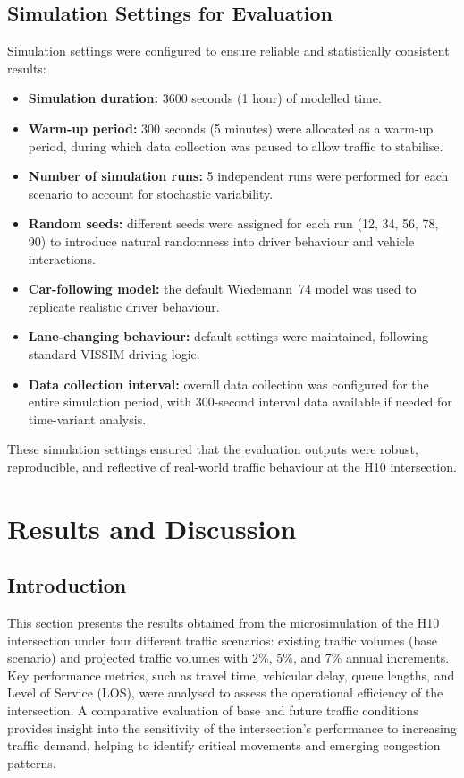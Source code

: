 \documentclass[11pt]{article}
\begin{document}
\subsection{Simulation Settings for Evaluation}
Simulation settings were configured to ensure reliable and statistically consistent results:
\begin{itemize}
  \item \textbf{Simulation duration:} 3600 seconds (1 hour) of modelled time.
  \item \textbf{Warm-up period:} 300 seconds (5 minutes) were allocated as a warm-up period, during
  which data collection was paused to allow traffic to stabilise.
  \item \textbf{Number of simulation runs:} 5 independent runs were performed for each scenario to
  account for stochastic variability.
  \item \textbf{Random seeds:} different seeds were assigned for each run (12, 34, 56, 78, 90) to
  introduce natural randomness into driver behaviour and vehicle interactions.
  \item \textbf{Car-following model:} the default Wiedemann~74 model was used to replicate realistic
  driver behaviour.
  \item \textbf{Lane-changing behaviour:} default settings were maintained, following standard VISSIM
  driving logic.
  \item \textbf{Data collection interval:} overall data collection was configured for the entire
  simulation period, with 300-second interval data available if needed for time-variant analysis.
\end{itemize}
These simulation settings ensured that the evaluation outputs were robust, reproducible, and reflective
of real-world traffic behaviour at the H10 intersection.

\section{Results and Discussion}

\subsection{Introduction}
This section presents the results obtained from the microsimulation of the H10 intersection under four
different traffic scenarios: existing traffic volumes (base scenario) and projected traffic volumes with
2\%, 5\%, and 7\% annual increments. Key performance metrics, such as travel time, vehicular delay, queue
lengths, and Level of Service (LOS), were analysed to assess the operational efficiency of the
intersection. A comparative evaluation of base and future traffic conditions provides insight into the
sensitivity of the intersection's performance to increasing traffic demand, helping to identify critical
movements and emerging congestion patterns.
\end{document}
